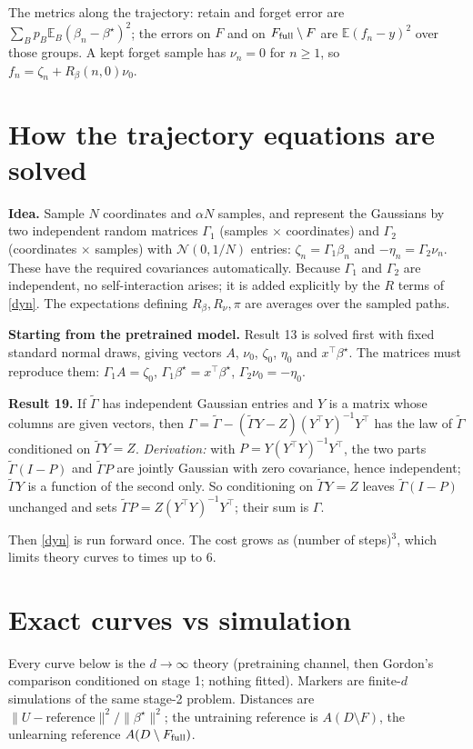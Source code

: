 \documentclass[10pt]{article}
\newcommand{\bs}{\beta^\star}\newcommand{\E}{\mathbb E}\newcommand{\asinh}{\operatorname{arcsinh}}\newcommand{\sk}{\sqrt k}
\newcommand{\Part}[2]{\clearpage{\LARGE\bfseries Part #1.\ #2\par}\bigskip}
\begin{document}
The metrics along the trajectory: retain and forget error are $\sum_Bp_B\E_B(\beta_n-\bs)^2$; the errors on $F$ and on $F_{\mathrm{full}}\setminus F$ are $\E(f_n-y)^2$ over those groups. A kept forget sample has $\nu_n=0$ for $n\ge1$, so $f_n=\zeta_n+R_\beta(n,0)\nu_0$.

\section{How the trajectory equations are solved}
\textbf{Idea.} Sample $N$ coordinates and $\alpha N$ samples, and represent the Gaussians by two independent random matrices $\Gamma_1$ (samples $\times$ coordinates) and $\Gamma_2$ (coordinates $\times$ samples) with $\mathcal N(0,1/N)$ entries: $\zeta_n=\Gamma_1\beta_n$ and $-\eta_n=\Gamma_2\nu_n$. These have the required covariances automatically. Because $\Gamma_1$ and $\Gamma_2$ are independent, no self-interaction arises; it is added explicitly by the $R$ terms of \eqref{dyn}. The expectations defining $R_\beta,R_\nu,\pi$ are averages over the sampled paths.

\textbf{Starting from the pretrained model.} Result 13 is solved first with fixed standard normal draws, giving vectors $A$, $\nu_0$, $\zeta_0$, $\eta_0$ and $x^\top\bs$. The matrices must reproduce them: $\Gamma_1A=\zeta_0$, $\Gamma_1\bs=x^\top\bs$, $\Gamma_2\nu_0=-\eta_0$.

\textbf{Result 19.} If $\tilde\Gamma$ has independent Gaussian entries and $Y$ is a matrix whose columns are given vectors, then $\Gamma=\tilde\Gamma-(\tilde\Gamma Y-Z)(Y^\top Y)^{-1}Y^\top$ has the law of $\tilde\Gamma$ conditioned on $\tilde\Gamma Y=Z$. \emph{Derivation:} with $P=Y(Y^\top Y)^{-1}Y^\top$, the two parts $\tilde\Gamma(I-P)$ and $\tilde\Gamma P$ are jointly Gaussian with zero covariance, hence independent; $\tilde\Gamma Y$ is a function of the second only. So conditioning on $\tilde\Gamma Y=Z$ leaves $\tilde\Gamma(I-P)$ unchanged and sets $\tilde\Gamma P=Z(Y^\top Y)^{-1}Y^\top$; their sum is $\Gamma$.

Then \eqref{dyn} is run forward once. The cost grows as (number of steps)$^3$, which limits theory curves to times up to $6$.

\Part{V}{Results}
\section{Exact curves vs simulation}\label{sec:curves}
Every curve below is the $d\to\infty$ theory (pretraining channel, then Gordon's comparison conditioned on stage 1; nothing fitted). Markers are finite-$d$ simulations of the same stage-2 problem. Distances are $\|U-\text{reference}\|^2/\|\beta^\star\|^2$; the untraining reference is $A(D\setminus F)$, the unlearning reference $A(D\setminus F_{\mathrm{full}})$.
\end{document}

